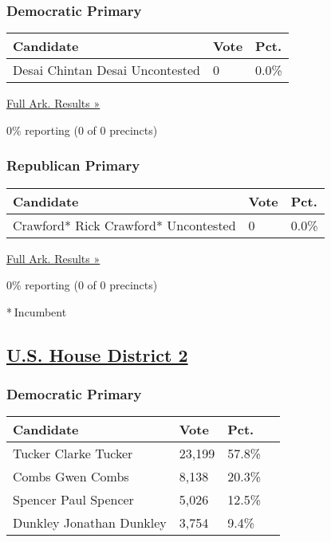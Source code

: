 \hypertarget{democratic-primary-1}{%
\subsubsection{Democratic Primary}\label{democratic-primary-1}}

\begin{longtable}[]{@{}lll@{}}
\toprule
Candidate & Vote & Pct.\tabularnewline
\midrule
\endhead
 Desai Chintan Desai Uncontested & 0 & 0.0\%\tabularnewline
\bottomrule
\end{longtable}

\href{https://www.nytimes3xbfgragh.onion/elections/results/arkansas}{Full
Ark. Results »}

0\% reporting (0 of 0 precincts)

\hypertarget{republican-primary-1}{%
\subsubsection{Republican Primary}\label{republican-primary-1}}

\begin{longtable}[]{@{}lll@{}}
\toprule
Candidate & Vote & Pct.\tabularnewline
\midrule
\endhead
 Crawford* Rick Crawford* Uncontested & 0 & 0.0\%\tabularnewline
\bottomrule
\end{longtable}

\href{https://www.nytimes3xbfgragh.onion/elections/results/arkansas}{Full
Ark. Results »}

0\% reporting (0 of 0 precincts)

* Incumbent

\hypertarget{us-house-district-2}{%
\subsection{\texorpdfstring{\href{https://www.nytimes3xbfgragh.onion/elections/results/arkansas-house-district-2-primary-election}{U.S.
House District 2}}{U.S. House District 2}}\label{us-house-district-2}}

\hypertarget{democratic-primary-2}{%
\subsubsection{Democratic Primary}\label{democratic-primary-2}}

\begin{longtable}[]{@{}llll@{}}
\toprule
Candidate & Vote & Pct. &\tabularnewline
\midrule
\endhead
 Tucker Clarke Tucker & 23,199 & 57.8\% &\tabularnewline
 Combs Gwen Combs & 8,138 & 20.3\% &\tabularnewline
 Spencer Paul Spencer & 5,026 & 12.5\% &\tabularnewline
 Dunkley Jonathan Dunkley & 3,754 & 9.4\% &\tabularnewline
\bottomrule
\end{longtable}

